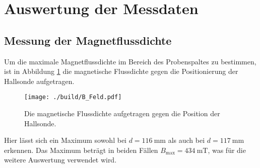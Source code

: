 \section{Auswertung der Messdaten}
\label{sec:Auswertung}
\subsection{Messung der Magnetflussdichte}
\label{subsec:Magnetflussdichte}
Um die maximale Magnetflussdichte im Bereich des Probenspaltes zu bestimmen,
ist in Abbildung \ref{fig:Magnetflussdichte} die magnetische Flussdichte gegen die Positionierung
der Hallsonde aufgetragen.
\begin{figure}[h]
  \centering
  \texttt{[image: ./build/B\_Feld.pdf]}
  \caption{Die magnetische Flussdichte aufgetragen gegen die Position der Hallsonde.}
  \label{fig:Magnetflussdichte}
\end{figure}
Hier lässt sich ein Maximum sowohl bei $d=\SI{116}{\milli\meter}$ als auch bei
$d=\SI{117}{\milli\meter}$ erkennen. Das Maximum beträgt in beiden Fällen
$B_{\text{max}}=\SI{434}{\milli\tesla}$, was für die weitere Auswertung verwendet wird.
